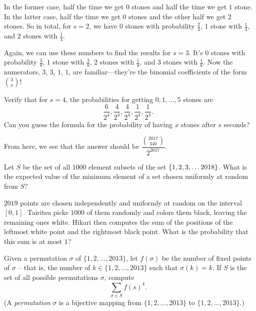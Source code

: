 \documentclass[11pt,paper=letter]{scrartcl}
\begin{document}
In the former case, half the time we get $0$ stones and half the time we get $1$ stone. In the latter case, half the time we get $0$ stones and the other half we get $2$ stones. So in total, for $s = 2$, we have $0$ stones with probability $\frac{2}{4}$, $1$ stone with $\frac{1}{4}$, and $2$ stones with $\frac{1}{4}$.

Again, we can use these numbers to find the results for $s = 3$. It's $0$ stones with probability $\frac{3}{8}$, $1$ stone with $\frac{3}{8}$, $2$ stones with $\frac{1}{8}$, and $3$ stones with $\frac{1}{8}$. Now the numerators, $3$, $3$, $1$, $1$, are familiar---they're the binomial coefficients of the form $\binom{3}{x}$!

\begin{exrboxed}
  Verify that for $s = 4$, the probabilities for getting $0, 1, \ldots, 5$ stones are\[\frac{6}{2^4}, \frac{4}{2^4}, \frac{4}{2^4}, \frac{1}{2^4}, \frac{1}{2^4}.\] Can you guess the formula for the probability of having $x$ stones after $s$ seconds?
\end{exrboxed}

From here, we see that the answer should be $\dfrac{\binom{2017}{340}}{2^{2017}}$.

\begin{mdframed}[style=exmdbox]

\begin{problem}
  Let $S$ be the set of all $1000$ element subsets of the set $\left\{ 1, 2, 3, \ldots 2018 \right\}$. What is the expected value of the minimum element of a set chosen uniformly at random from $S$?
\end{problem}

\begin{problem}
$2019$ points are chosen independently and uniformly at random on the interval $[0,1]$. Tairitsu picks $1000$ of them randomly and colors them black, leaving the remaining ones white. Hikari then computes the sum of the positions of the leftmost white point and the rightmost black point. What is the probability that this sum is at most $1$?
\end{problem}

\begin{problem}
Given a permutation $\sigma$ of $\{1, 2, \ldots, 2013\}$, let $f(\sigma)$ be the number of fixed points of $\sigma$ -- that is, the number of $k \in \{1, 2, \ldots, 2013\}$ such that $\sigma(k) = k$. If $S$ is the set of all possible permutations $\sigma$, compute
\[
  \sum_{\sigma \in S} f(s)^4.
\]
(A \textit{permutation} $\sigma$ is a bijective mapping from $\{1, 2, \ldots, 2013\}$ to $\{1, 2, \ldots, 2013\}$.) \hint{\ref{h:5}}
\end{problem}


\end{mdframed}
\end{document}
